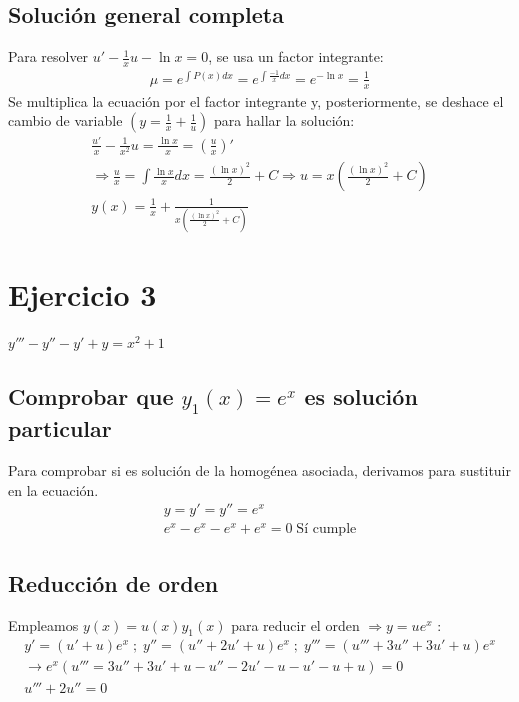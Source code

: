 \documentclass[]{scrartcl}
\begin{document}
\subsection{Solución general completa}

Para resolver $u'-\frac{1}{x}u-\ln x =0$, se usa un factor integrante:
\begin{gather*}
	\mu=e^{\int P(x) dx} = e^{\int \frac{-1}{x}dx}=e^{-\ln x}=\frac{1}{x}
\end{gather*}
Se multiplica la ecuación por el factor integrante y, posteriormente, se deshace el cambio de variable $\left( y=\frac{1}{x}+\frac{1}{u} \right)$ para hallar la solución:
\begin{gather*}
	\frac{u'}{x}-\frac{1}{x^2}u=\frac{\ln x}{x}=\left( \frac{u}{x} \right)'\\
	\Rightarrow \frac{u}{x}=\int{\frac{\ln x}{x}dx}=\frac{(\ln x)^2}{2}+C \Rightarrow u=x\left( \frac{(\ln x)^2}{2}+C \right)\\
	\boxed{y(x)=\frac{1}{x}+\frac{1}{x\left( \frac{(\ln x)^2}{2}+C \right)}}
\end{gather*}

\section{Ejercicio 3}

\begin{center}
	$y'''-y''-y'+y=x^2+1$
\end{center}

\subsection{Comprobar que $y_1(x)=e^x$ es solución particular}

Para comprobar si es solución de la homogénea asociada, derivamos para sustituir en la ecuación.
\begin{gather*}
	y=y'=y''=e^x\\
	e^x-e^x-e^x+e^x=0\; \boxed{\text{Sí cumple}}
\end{gather*}

\subsection{Reducción de orden}

Empleamos $y(x)=u(x)y_1(x)$ para reducir el orden $\Rightarrow y=ue^x$ :
\begin{gather*}
	y'=(u'+u)e^x\; ; \; y''=(u''+2u'+u)e^x\; ; \; y'''=(u'''+3u''+3u'+u)e^x\\
	\rightarrow e^x(u'''=3u''+3u'+u-u''-2u'-u-u'-u+u)=0\\
	\boxed{u'''+2u''=0}
\end{gather*}
\end{document}
